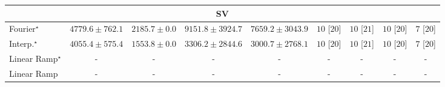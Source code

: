 \begin{tabular}{l|cccc|cccc|}
\cline{1-9}
\multicolumn{9}{c}{\rule{0pt}{8pt}SV} \\
\midrule
Fourier$^\star$ & {\cellcolor[HTML]{94B6D7}} \color[HTML]{000000} $4779.6\pm 762.1$ & {\cellcolor[HTML]{F2ECF5}} \color[HTML]{000000} $2185.7\pm 0.0$ & {\cellcolor[HTML]{023A5B}} \color[HTML]{F1F1F1} $9151.8\pm 3924.7$ & {\cellcolor[HTML]{0567A2}} \color[HTML]{F1F1F1} $7659.2\pm 3043.9$ & {\cellcolor[HTML]{49006A}} \color[HTML]{F1F1F1} $10$ [$20$] & {\cellcolor[HTML]{49006A}} \color[HTML]{F1F1F1} $10$ [$21$] & {\cellcolor[HTML]{49006A}} \color[HTML]{F1F1F1} $10$ [$20$] & {\cellcolor[HTML]{CD238F}} \color[HTML]{F1F1F1} $7$ [$20$] \\
Interp.$^\star$ & {\cellcolor[HTML]{B7C5DF}} \color[HTML]{000000} $4055.4\pm 575.4$ & {\cellcolor[HTML]{FFF7FB}} \color[HTML]{000000} $1553.8\pm 0.0$ & {\cellcolor[HTML]{D5D5E8}} \color[HTML]{000000} $3306.2\pm 2844.6$ & {\cellcolor[HTML]{DEDCEC}} \color[HTML]{000000} $3000.7\pm 2768.1$ & {\cellcolor[HTML]{49006A}} \color[HTML]{F1F1F1} $10$ [$20$] & {\cellcolor[HTML]{49006A}} \color[HTML]{F1F1F1} $10$ [$21$] & {\cellcolor[HTML]{49006A}} \color[HTML]{F1F1F1} $10$ [$20$] & {\cellcolor[HTML]{CD238F}} \color[HTML]{F1F1F1} $7$ [$20$] \\
Linear Ramp$^\star$ & {\cellcolor[HTML]{000000}} \color[HTML]{F1F1F1} {\cellcolor{white}} \color{black} - & {\cellcolor[HTML]{000000}} \color[HTML]{F1F1F1} {\cellcolor{white}} \color{black} - & {\cellcolor[HTML]{000000}} \color[HTML]{F1F1F1} {\cellcolor{white}} \color{black} - & {\cellcolor[HTML]{000000}} \color[HTML]{F1F1F1} {\cellcolor{white}} \color{black} - & {\cellcolor[HTML]{000000}} \color[HTML]{F1F1F1} {\cellcolor{white}} \color{black} - & {\cellcolor[HTML]{000000}} \color[HTML]{F1F1F1} {\cellcolor{white}} \color{black} - & {\cellcolor[HTML]{000000}} \color[HTML]{F1F1F1} {\cellcolor{white}} \color{black} - & {\cellcolor[HTML]{000000}} \color[HTML]{F1F1F1} {\cellcolor{white}} \color{black} - \\
Linear Ramp & {\cellcolor[HTML]{000000}} \color[HTML]{F1F1F1} {\cellcolor{white}} \color{black} - & {\cellcolor[HTML]{000000}} \color[HTML]{F1F1F1} {\cellcolor{white}} \color{black} - & {\cellcolor[HTML]{000000}} \color[HTML]{F1F1F1} {\cellcolor{white}} \color{black} - & {\cellcolor[HTML]{000000}} \color[HTML]{F1F1F1} {\cellcolor{white}} \color{black} - & {\cellcolor[HTML]{000000}} \color[HTML]{F1F1F1} {\cellcolor{white}} \color{black} - & {\cellcolor[HTML]{000000}} \color[HTML]{F1F1F1} {\cellcolor{white}} \color{black} - & {\cellcolor[HTML]{000000}} \color[HTML]{F1F1F1} {\cellcolor{white}} \color{black} - & {\cellcolor[HTML]{000000}} \color[HTML]{F1F1F1} {\cellcolor{white}} \color{black} - \\

\end{tabular}
